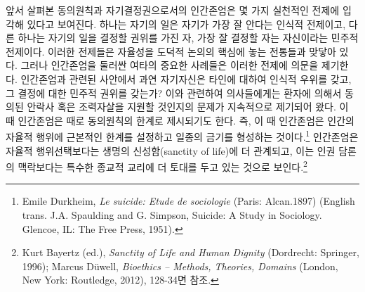 앞서 살펴본 동의원칙과 자기결정권으로서의 인간존엄은 몇 가지 실천적인 전제에 입각해 있다고 보여진다. 하나는 자기의 일은 자기가 가장 잘 안다는 인식적 전제이고, 다른 하나는 자기의 일을 결정할 권위를 가진 자, 가장 잘 결정할 자는 자신이라는 민주적 전제이다. 이러한 전제들은 자율성을 도덕적 논의의 핵심에 놓는 전통들과 맞닿아 있다. 그러나 인간존엄을 둘러싼 여타의 중요한 사례들은 이러한 전제에 의문을 제기한다. 인간존엄과 관련된 사안에서 과연 자기자신은 타인에 대하여 인식적 우위를 갖고, 그 결정에 대한 민주적 권위를 갖는가? 이와 관련하여 의사들에게는 환자에 의해서 동의된 안락사 혹은 조력자살을 지원할 것인지의 문제가 지속적으로 제기되어 왔다. 이 때 인간존엄은 때로 동의원칙의 한계로 제시되기도 한다. 즉, 이 때 인간존엄은 인간의 자율적 행위에 근본적인 한계를 설정하고 일종의 금기를 형성하는 것이다.\footnote{Emile Durkheim, \emph{Le suicide: Etude de sociologie} (Paris: Alcan.1897) (English trans. J.A. Spaulding and G. Simpson, Suicide: A Study in Sociology. Glencoe, IL: The Free Press, 1951).} 인간존엄은 자율적 행위선택보다는 생명의 신성함(sanctity of life)에 더 관계되고, 이는 인권 담론의 맥락보다는 특수한 종교적 교리에 더 토대를 두고 있는 것으로 보인다.\footnote{Kurt Bayertz (ed.), \emph{Sanctity of Life and Human Dignity} (Dordrecht: Springer, 1996); Marcus Düwell, \emph{Bioethics -- Methods, Theories, Domains} (London, New York: Routledge, 2012), 128-34면 참조.}


